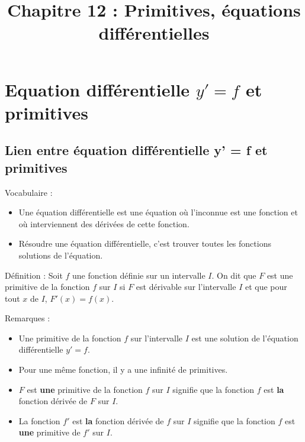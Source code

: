 \documentclass[11pt,a4paper]{article}
\begin{document}
\title{\textbf{Chapitre 12 : Primitives, équations différentielles}}
\date{}
\maketitle

\section{Equation différentielle $y' = f$ et primitives}

\subsection{Lien entre équation différentielle y' = f et primitives}

\begin{boiteRemarque}{Vocabulaire :}
    \begin{itemize}
        \item Une équation différentielle est une équation où l'inconnue est une fonction et où interviennent des dérivées de cette fonction.
        \item Résoudre une équation différentielle, c'est trouver toutes les fonctions solutions de l'équation.
    \end{itemize}
\end{boiteRemarque}

\begin{boiteDef}{Définition :}
    Soit $f$ une fonction définie sur un intervalle $I$. 
    \newline
    On dit que $F$ est une primitive de la fonction $f$ sur $I$ si $F$ est dérivable sur l'intervalle $I$ et que pour tout $x$ de $I$, $F'(x) = f(x)$.
\end{boiteDef}

\begin{boiteRemarque}{Remarques :}
    \begin{itemize}
        \item Une primitive de la fonction $f$ sur l'intervalle $I$ est une solution de l'équation différentielle $y' = f$.
        \item Pour une même fonction, il y a une infinité de primitives.
        \item $F$ est \textbf{une} primitive de la fonction $f$ sur $I$ signifie que la fonction $f$ est \textbf{la} fonction dérivée de $F$ sur $I$.
        \item La fonction $f'$ est \textbf{la} fonction dérivée de $f$ sur $I$ signifie que la fonction $f$ est \textbf{une} primitive de $f'$ sur $I$.
    \end{itemize}   
\end{boiteRemarque}
\end{document}
